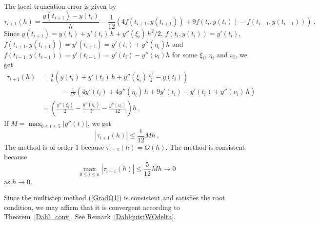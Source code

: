 { The local truncation error is given by 
\[
\tau_{i+1}(h) = \frac{y(t_{i+1}) - y(t_i)}{h} - \frac{1}{12}
\left( 4 f(t_{i+1},y(t_{i+1})) + 9f(t_i,y(t_i)) -f(t_{i-1},y(t_{i-1}))
\right) \ .
\]
Since
$y(t_{i+1}) = y(t_i) + y'(t_i)\,h + y''(\xi_i)\,h^2/2$,
$f(t_i,y(t_i)) = y'(t_i)$,
$f(t_{i+1},y(t_{i+1})) = y'(t_{i+1}) = y'(t_i) + y''(\eta_i) h$ and
$f(t_{i-1},y(t_{i-1})) = y'(t_{i-1}) = y'(t_i) - y''(\nu_i) h$
for some $\xi_i$, $\eta_i$ and $\nu_i$, we get
\begin{align*}
\tau_{i+1}(h) &= \frac{1}{h}
\left(y(t_i) + y'(t_i)\,h + y''(\xi_i)\,\frac{h^2}{2} - y(t_i) \right) \\
&\qquad \quad - \frac{1}{12}
\left(4y'(t_i) + 4y''(\eta_i)\,h + 9 y'(t_i) - y'(t_i) + y''(\nu_i)\,h
\right) \\
& = \left( \frac{y''(\xi_i)}{2}
- \frac{y''(\eta_i)}{3} - \frac{y''(\nu_i)}{12}\right)h \ .
\end{align*}
If $\displaystyle M= \max_{0 \leq t \leq 5} | y''(t) |$, we get
\[
| \tau_{i+1}(h) | \leq \frac{1}{12} M h \ .
\]
The method is of order $1$ because $\tau_{i+1}(h) = O(h)$.
The method is consistent because
\[
\max_{0\leq i \leq n} | \tau_{i+1}(h) | \leq \frac{5}{12} M h
\rightarrow 0
\]
as $h\rightarrow 0$.

Since the multistep method (\ref{GradQ1}) is consistent and satisfies
the root condition, we may affirm that it is convergent according to
Theorem~\ref{Dahl_conv}.  See Remark~\ref{DahlquistWOdelta}.
}

